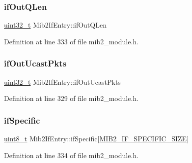 \subsubsection{\texorpdfstring{if\+Out\+Q\+Len}{ifOutQLen}}
{\footnotesize\ttfamily \hyperlink{stdint_8h_a435d1572bf3f880d55459d9805097f62}{uint32\+\_\+t} Mib2\+If\+Entry\+::if\+Out\+Q\+Len}



Definition at line 333 of file mib2\+\_\+module.\+h.

\mbox{\label{structMib2IfEntry_a80688af5872a392872a99a0ff8078510}} 
\subsubsection{\texorpdfstring{if\+Out\+Ucast\+Pkts}{ifOutUcastPkts}}
{\footnotesize\ttfamily \hyperlink{stdint_8h_a435d1572bf3f880d55459d9805097f62}{uint32\+\_\+t} Mib2\+If\+Entry\+::if\+Out\+Ucast\+Pkts}



Definition at line 329 of file mib2\+\_\+module.\+h.

\mbox{\label{structMib2IfEntry_a5f7f368817a3bde57acc18d8db1f502a}} 
\subsubsection{\texorpdfstring{if\+Specific}{ifSpecific}}
{\footnotesize\ttfamily \hyperlink{stdint_8h_aba7bc1797add20fe3efdf37ced1182c5}{uint8\+\_\+t} Mib2\+If\+Entry\+::if\+Specific\mbox{[}\hyperlink{mib2__module_8h_af5a14fedbc2e2ee637df5608cdd8527e}{M\+I\+B2\+\_\+\+I\+F\+\_\+\+S\+P\+E\+C\+I\+F\+I\+C\+\_\+\+S\+I\+ZE}\mbox{]}}



Definition at line 334 of file mib2\+\_\+module.\+h.

\mbox{\label{structMib2IfEntry_aceb84584422b78ac60b727b31c24f27f}} 
